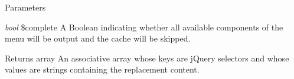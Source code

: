 \begin{DoxyParams}{Parameters}
\item[{\em bool}]\$complete A Boolean indicating whether all available components of the menu will be output and the cache will be skipped.\end{DoxyParams}
\begin{DoxyReturn}{Returns}
array An associative array whose keys are jQuery selectors and whose values are strings containing the replacement content. 
\end{DoxyReturn}
